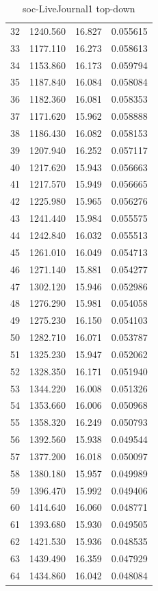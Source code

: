 \documentclass[10pt,twocolumn,letterpaper]{article}
\begin{document}
\begin{table}[h]
\begin{tabular}{@{}c|ccc@{}}
32 & 1240.560 & 16.827 & 0.055615 \\
33 & 1177.110 & 16.273 & 0.058613 \\
34 & 1153.860 & 16.173 & 0.059794 \\
35 & 1187.840 & 16.084 & 0.058084 \\
36 & 1182.360 & 16.081 & 0.058353 \\
37 & 1171.620 & 15.962 & 0.058888 \\
38 & 1186.430 & 16.082 & 0.058153 \\
39 & 1207.940 & 16.252 & 0.057117 \\
40 & 1217.620 & 15.943 & 0.056663 \\
41 & 1217.570 & 15.949 & 0.056665 \\
42 & 1225.980 & 15.965 & 0.056276 \\
43 & 1241.440 & 15.984 & 0.055575 \\
44 & 1242.840 & 16.032 & 0.055513 \\
45 & 1261.010 & 16.049 & 0.054713 \\
46 & 1271.140 & 15.881 & 0.054277 \\
47 & 1302.120 & 15.946 & 0.052986 \\
48 & 1276.290 & 15.981 & 0.054058 \\
49 & 1275.230 & 16.150 & 0.054103 \\
50 & 1282.710 & 16.071 & 0.053787 \\
51 & 1325.230 & 15.947 & 0.052062 \\
52 & 1328.350 & 16.171 & 0.051940 \\
53 & 1344.220 & 16.008 & 0.051326 \\
54 & 1353.660 & 16.006 & 0.050968 \\
55 & 1358.320 & 16.249 & 0.050793 \\
56 & 1392.560 & 15.938 & 0.049544 \\
57 & 1377.200 & 16.018 & 0.050097 \\
58 & 1380.180 & 15.957 & 0.049989 \\
59 & 1396.470 & 15.992 & 0.049406 \\
60 & 1414.640 & 16.060 & 0.048771 \\
61 & 1393.680 & 15.930 & 0.049505 \\
62 & 1421.530 & 15.936 & 0.048535 \\
63 & 1439.490 & 16.359 & 0.047929 \\
64 & 1434.860 & 16.042 & 0.048084 \\
\bottomrule
\end{tabular}
\caption{soc-LiveJournal1 top-down}
\end{table}
\end{document}
